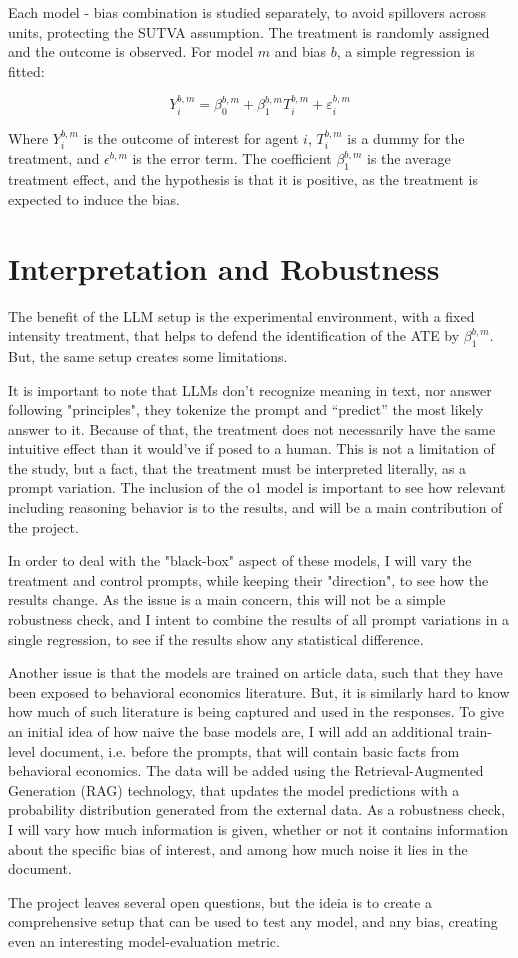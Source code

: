 \documentclass[12pt]{article}
\begin{document}
Each model - bias combination is studied separately, to avoid spillovers across units, protecting the SUTVA assumption. The treatment is randomly assigned and the outcome is observed. For model $m$ and bias $b$, a simple regression is fitted:

$$Y^{b,m}_i = \beta^{b,m}_0 + \beta^{b,m}_1 T^{b,m}_i + \varepsilon^{b,m}_i$$

Where $Y^{b,m}_i$ is the outcome of interest for agent $i$, $T^{b,m}_i$ is a dummy for the treatment, and $\epsilon^{b,m}$ is the error term. The coefficient $\beta^{b,m}_1$ is the average treatment effect, and the hypothesis is that it is positive, as the treatment is expected to induce the bias.


\section*{Interpretation and Robustness}

The benefit of the LLM setup is the experimental environment, with a fixed intensity treatment, that helps to defend the identification of the ATE by $\beta^{b,m}_1$. But, the same setup creates some limitations.

It is important to note that LLMs don't recognize meaning in text, nor answer following "principles", they tokenize the prompt and “predict” the most likely answer to it. Because of that, the treatment does not necessarily have the same intuitive effect than it would've if posed to a human. This is not a limitation of the study, but a fact, that the treatment must be interpreted literally, as a prompt variation. The inclusion of the o1 model is important to see how relevant including reasoning behavior is to the results, and will be a main contribution of the project.

In order to deal with the "black-box" aspect of these models, I will vary the treatment and control prompts, while keeping their "direction", to see how the results change. As the issue is a main concern, this will not be a simple robustness check, and I intent to combine the results of all prompt variations in a single regression, to see if the results show any statistical difference.

Another issue is that the models are trained on article data, such that they have been exposed to behavioral economics literature. But, it is similarly hard to know how much of such literature is being captured and used in the responses. To give an initial idea of how naive the base models are, I will add an additional train-level document, i.e. before the prompts, that will contain basic facts from behavioral economics. The data will be added using the Retrieval-Augmented Generation (RAG) technology, that updates the model predictions with a probability distribution generated from the external data. As a robustness check, I will vary how much information is given, whether or not it contains information about the specific bias of interest, and among how much noise it lies in the document.

The project leaves several open questions, but the ideia is to create a comprehensive setup that can be used to test any model, and any bias, creating even an interesting model-evaluation metric.
\end{document}
